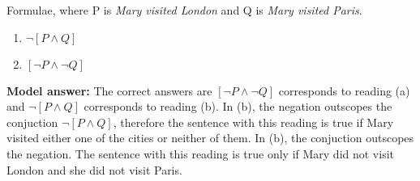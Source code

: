 \documentclass[a4,11pt]{article}
\newcommand{\6}{\mbox{$[\hspace*{-.6mm}[$}}
\newcommand{\9}{\mbox{$]\hspace*{-.6mm}]$}}
\begin{document}
\begin{enumerate}[leftmargin = 12pt]
Formulae, where P is \textit{Mary visited London} and Q is \textit{Mary visited Paris}. 
\begin{enumerate}[noitemsep]
\item $\neg [P \land Q ]$
\item $[\neg P \land \neg Q]$
\end{enumerate}

{ \bf Model answer:}  The correct answers are $[\neg P \land \neg Q]$ corresponds to reading (a) and $\neg [P \land Q ]$ corresponds to reading (b). In (b), the negation outscopes the conjuction $\neg [P \land Q ]$, therefore the sentence with this reading is true if Mary visited either one of the cities or neither of them. In (b), the conjuction outscopes the negation. The sentence with this reading is true only if Mary did not visit London and she did not visit Paris.


\end{enumerate}
\end{document}
